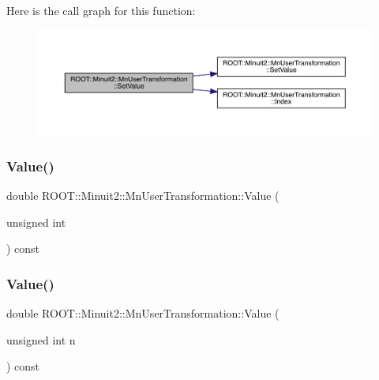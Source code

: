 Here is the call graph for this function\+:
\nopagebreak
\begin{figure}[H]
\begin{center}
\leavevmode
\includegraphics[width=350pt]{d9/d98/classROOT_1_1Minuit2_1_1MnUserTransformation_a30717c0bcc5206cc957e505b9cfd64fd_cgraph}
\end{center}
\end{figure}
\mbox{\label{classROOT_1_1Minuit2_1_1MnUserTransformation_a63d57196d60559aa9df6c9c499cd21d0}} 
\subsubsection{\texorpdfstring{Value()}{Value()}\hspace{0.1cm}{\footnotesize\ttfamily [1/6]}}
{\footnotesize\ttfamily double R\+O\+O\+T\+::\+Minuit2\+::\+Mn\+User\+Transformation\+::\+Value (\begin{DoxyParamCaption}\item[{unsigned int}]{ }\end{DoxyParamCaption}) const}

\mbox{\label{classROOT_1_1Minuit2_1_1MnUserTransformation_a63d57196d60559aa9df6c9c499cd21d0}} 
\subsubsection{\texorpdfstring{Value()}{Value()}\hspace{0.1cm}{\footnotesize\ttfamily [2/6]}}
{\footnotesize\ttfamily double R\+O\+O\+T\+::\+Minuit2\+::\+Mn\+User\+Transformation\+::\+Value (\begin{DoxyParamCaption}\item[{unsigned int}]{n }\end{DoxyParamCaption}) const}

